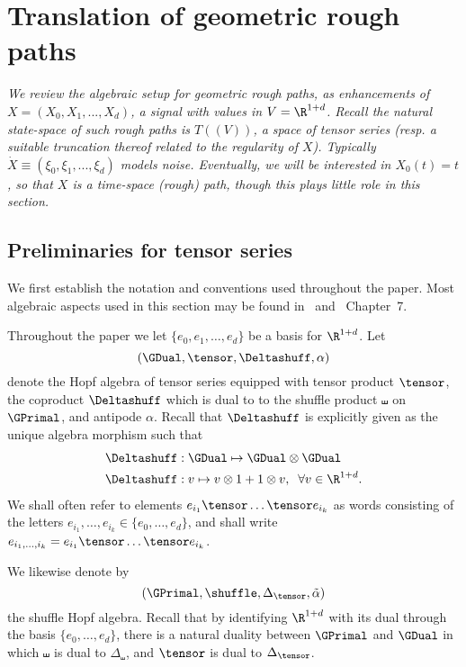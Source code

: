 \documentclass{article}
\begin{document}
\section{Translation of geometric rough paths} \label{sec:TgRP}

{\it We review the algebraic setup for geometric rough paths, as enhancements of $X=(X_0,X_1, ... , X_d)$, a signal with values in $V=\R^{1+d}$. Recall the natural state-space of such rough paths is $T((V))$, a space of tensor series (resp. a suitable truncation thereof related to the regularity of $X$). Typically $\dot X \equiv (\xi_0,\xi_1,..., \xi_d)$ models noise. Eventually, we will be interested in $X_0 (t) = t$, so that $X$ is a time-space (rough) path, though this plays little role in this section. 
}


\subsection{Preliminaries for tensor series}\label{subsec:TensorPrelims}

We first establish the notation and conventions used throughout the paper. Most algebraic aspects used in this section may be found in~\cite{Reutenauer93} and~\cite{FrizVictoir10} Chapter~7.

Throughout the paper we let $\{e_0, e_1,\ldots, e_d\}$ be a basis for $\R^{1+d}$. Let
\[
(\GDual, \tensor ,\Deltashuff, \alpha)
\]
denote the Hopf algebra of tensor series equipped with tensor product $\tensor$, the coproduct $\Deltashuff$ which is dual to to the shuffle product $\shuffle$ on $\GPrimal$, and antipode $\alpha$. Recall that $\Deltashuff$ is explicitly given as the unique algebra morphism such that
\begin{align*}
\Deltashuff &: \GDual \mapsto \GDual\otimes\GDual \\
\Deltashuff &: v \mapsto v\otimes 1 + 1\otimes v, \; \; \forall v \in \R^{1+d}.
\end{align*}
We shall often refer to elements $e_{i_1}\tensor\ldots \tensor e_{i_k}$ as words consisting of the letters $e_{i_1}, \ldots, e_{i_k} \in \{e_0,\ldots, e_d\}$, and shall write $e_{i_1,\ldots, i_k} = e_{i_1}\tensor\ldots \tensor e_{i_k}$.


We likewise denote by
\[
(\GPrimal, \shuffle, \Delta_\tensor, \tilde \alpha)
\]
the shuffle Hopf algebra. Recall that by identifying $\R^{1+d}$ with its dual through the basis $\{e_0,\ldots, e_d\}$, there is a natural duality between $\GPrimal$ and $\GDual$ in which $\shuffle$ is dual to $\Delta_\shuffle$, and $\tensor$ is dual to $\Delta_\tensor$.
\end{document}
